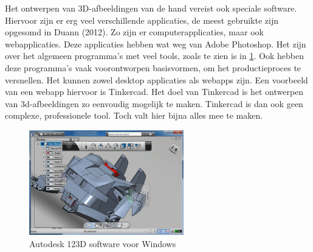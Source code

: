 Het ontwerpen van 3D-afbeeldingen van de hand vereist ook speciale
software. Hiervoor zijn er erg veel verschillende applicaties, de meest
gebruikte zijn opgesomd in Duann (2012). Zo zijn er computerapplicaties,
maar ook webapplicaties. Deze applicaties hebben wat weg van Adobe
Photoshop. Het zijn over het algemeen programma's met veel tools, zoals
te zien is in \cref{fig:123d}. Ook hebben deze
programma's vaak voorontworpen basisvormen, om het productieproces te
versnellen. Het kunnen zowel desktop applicaties als webapps zijn. Een
voorbeeld van een webapp hiervoor is Tinkercad. Het doel van Tinkercad
is het ontwerpen van 3d-afbeeldingen zo eenvoudig mogelijk te maken.
Tinkercad is dan ook geen complexe, professionele tool. Toch valt hier
bijna alles mee te maken.

\begin{figure}
\centering
\includegraphics[width=0.6\textwidth,height=\textheight]{img/image_16.jpg}
\caption{Autodesk 123D software voor Windows\label{fig:123d}}
\end{figure}
